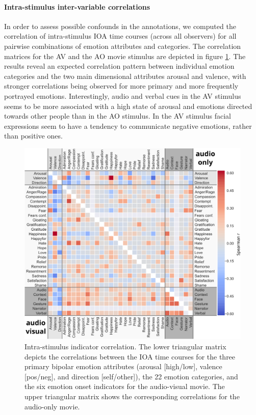 \paragraph{Intra-stimulus inter-variable correlations}

In order to assess possible confounds in the annotations, we computed the
correlation of intra-stimulus IOA time courses (across all observers) for all
pairwise combinations of emotion attributes and categories. The correlation
matrices for the AV and the AO movie stimulus are depicted in figure
\ref{fig:intrastimcorrelation}. The results reveal an expected correlation
pattern between individual emotion categories and the two main dimensional
attributes arousal and valence, with stronger correlations being observed for
more primary and more frequently portrayed emotions. Interestingly, audio and
verbal cues in the AV stimulus seems to be more associated with a high state
of arousal and emotions directed towards other people than in the AO stimulus.
In the AV stimulus facial expressions seem to have a tendency to communicate
negative emotions, rather than positive ones.


\begin{figure}
  \centering
  \includegraphics[width=\linewidth]{figures/bigcorr}
  \caption{Intra-stimulus indicator correlation. The lower triangular matrix
    depicts the correlations between the IOA time courses for
    the three primary bipolar emotion attributes (arousal [high/low], valence [pos/neg], and direction [self/other]), the
    22 emotion categories, and the six emotion onset indicators for the audio-visual
    movie. The upper triangular matrix shows the corresponding correlations for the
    audio-only movie.
 }
  \label{fig:intrastimcorrelation}
\end{figure}

